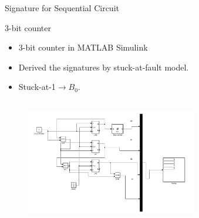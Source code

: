 \documentclass[aspectratio=1610]{beamer}
\begin{document}
\begin{frame}{Signature for Sequential Circuit}

\begin{block}{3-bit counter}
\end{block}
\begin{itemize}

\item 3-bit counter in MATLAB Simulink

\item Derived the signatures by stuck-at-fault model. 

\item Stuck-at-1$\rightarrow B_0$.

\end{itemize}



\vspace{-2.0cm}
\begin{figure}[tb!]
  \captionsetup{justification=centering}    
   \includegraphics[width=7.5cm, height=5.5cm, right]{Figures/matlab-counter.pdf}
  
\label{fig:matlab}
\end{figure}
\vspace{-5.0cm}
\begin{table}[tb!]

\label{stuck}
\end{table}
\end{frame}
\end{document}
